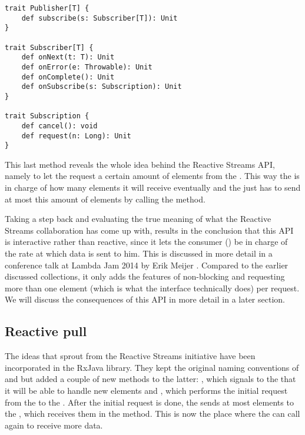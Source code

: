 \begin{minipage}{\linewidth}
\begin{lstlisting}[style=ScalaStyle, caption={Publisher, Subscriber and Subscription}, label={lst:pub-sub}]
trait Publisher[T] {
    def subscribe(s: Subscriber[T]): Unit
}

trait Subscriber[T] {
    def onNext(t: T): Unit
    def onError(e: Throwable): Unit
    def onComplete(): Unit
    def onSubscribe(s: Subscription): Unit
}

trait Subscription {
    def cancel(): void
    def request(n: Long): Unit
}
\end{lstlisting}
\end{minipage}

This last method reveals the whole idea behind the Reactive Streams API, namely to let the  request a certain amount of elements from the . This way the  is in charge of how many elements it will receive eventually and the  just has to send at most this amount of elements by calling the  method.

Taking a step back and evaluating the true meaning of what the Reactive Streams collaboration has come up with, results in the conclusion that this API is interactive rather than reactive, since it lets the consumer () be in charge of the rate at which data is sent to him. This is discussed in more detail in a conference talk at Lambda Jam 2014 by Erik Meijer \cite{meijer2014-Derivation}. Compared to the earlier discussed \ieb collections, it only adds the features of non-blocking and requesting more than one element (which is what the \ieb interface technically does) per request. We will discuss the consequences of this API in more detail in a later section.

\subsection{Reactive pull}
\label{subsec:reactive-pull}
The ideas that sprout from the Reactive Streams initiative have been incorporated in the RxJava library. They kept the original naming conventions of \obs and \obv but added a couple of new methods to the latter: , which signals to the \obs that it will be able to handle  new elements and , which performs the initial request from the \obv to the \obs. After the initial request is done, the \obs sends at most  elements to the \obv, which receives them in the  method. This is now the place where the \obv can call  again to receive more data.

